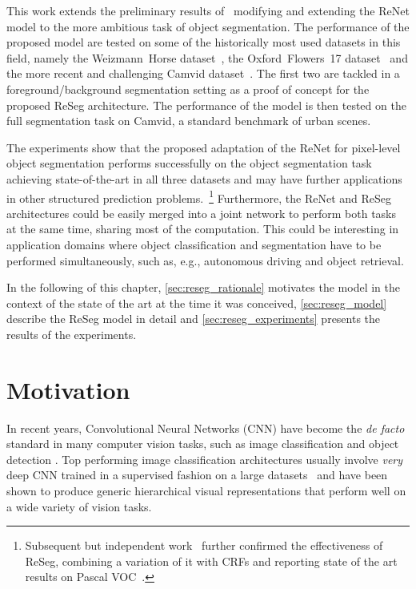 This work extends the preliminary results of~\cite{visin2015renet} modifying
and extending the ReNet model to the more ambitious task of object
segmentation. The performance of the proposed model are tested on some of the
historically most used datasets in this field, namely the Weizmann~Horse
dataset~\cite{Borenstein04combiningtop-down}, the Oxford~Flowers~17
dataset~\cite{Nilsback06} and the more recent and challenging Camvid
dataset~\citep{Brostow2010semantic,BrostowECCV08}. The first two are
tackled in a foreground/background segmentation setting as a proof of concept
for the proposed ReSeg architecture. The performance of the model is then
tested on the full segmentation task on Camvid, a standard benchmark of urban
scenes.

The experiments show that the proposed adaptation of the ReNet for pixel-level
object segmentation performs successfully on the object segmentation task
achieving state-of-the-art in all three datasets and may have further
applications in other structured prediction problems.~\footnote{
    Subsequent but independent work~\cite{DBLP:journals/corr/YanZJBY16} further
    confirmed the effectiveness of ReSeg, combining a variation of it with CRFs
    and reporting state of the art results on Pascal VOC~\cite{Everingham15}.}
Furthermore, the ReNet and ReSeg architectures could be easily merged into a
joint network to perform both tasks at the same time, sharing most of the
computation. This could be interesting in application domains where object
classification and segmentation have to be performed simultaneously, such as,
e.g., autonomous driving and object retrieval.

In the following of this chapter, \autoref{sec:reseg_rationale} motivates the
model in the context of the state of the art at the time it was conceived,
\autoref{sec:reseg_model} describe the ReSeg model in detail and
\autoref{sec:reseg_experiments} presents the results of the experiments.


\section{Motivation}\label{sec:reseg_rationale}

In recent years, Convolutional Neural Networks (CNN) have become the {\em de
facto} standard in many computer vision tasks, such as image classification and
object detection \cite{Krizhevsky-2012,Erhan2014}. Top performing image
classification architectures usually involve {\em very} deep CNN trained in a
supervised fashion on a large datasets~\cite{Lin2014,Simonyan2015,
szegedy2014going} and have been shown to produce generic hierarchical visual
representations that perform well on a wide variety of vision tasks.

